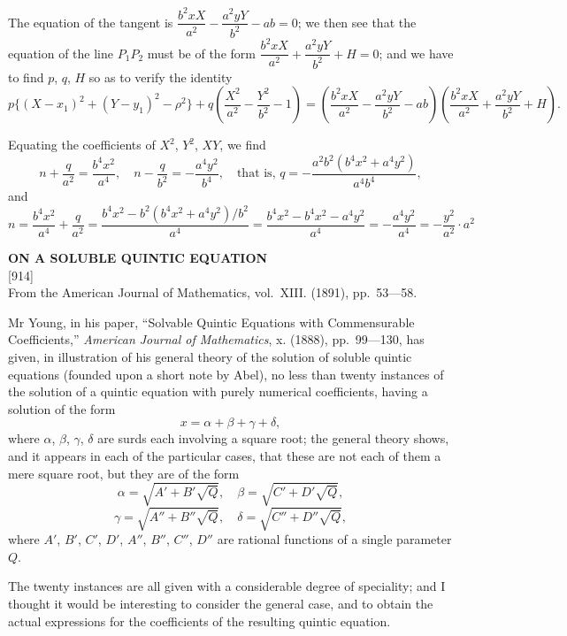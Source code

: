 \documentclass[11pt,a4paper]{article}
\newcommand{\paper}[4]{%
  \newpage
  \begin{center}
    {\large\bfseries #2}\\[0.5em]
    {\small [#1]}\\[0.3em]
    {\small #3}
  \end{center}
  \vspace{0.5em}
}
\begin{document}
The equation of the tangent is $\dfrac{b^2xX}{a^2} - \dfrac{a^2yY}{b^2} - ab = 0$; we then see that the equation of the line $P_1P_2$ must be of the form $\dfrac{b^2xX}{a^2} + \dfrac{a^2yY}{b^2} + H = 0$; and we have to find $p$, $q$, $H$ so as to verify the identity
\[
p\{(X - x_1)^2 + (Y - y_1)^2 - \rho^2\} + q\left(\frac{X^2}{a^2} - \frac{Y^2}{b^2} - 1\right) = \left(\frac{b^2xX}{a^2} - \frac{a^2yY}{b^2} - ab\right)\left(\frac{b^2xX}{a^2} + \frac{a^2yY}{b^2} + H\right).
\]

Equating the coefficients of $X^2$, $Y^2$, $XY$, we find
\[
n + \frac{q}{a^2} = \frac{b^4x^2}{a^4}, \quad n - \frac{q}{b^2} = -\frac{a^4y^2}{b^4}, \quad \text{that is, } q = -\frac{a^2b^2(b^4x^2 + a^4y^2)}{a^4b^4},
\]
and
\[
n = \frac{b^4x^2}{a^4} + \frac{q}{a^2} = \frac{b^4x^2 - b^2(b^4x^2 + a^4y^2)/b^2}{a^4} = \frac{b^4x^2 - b^4x^2 - a^4y^2}{a^4} = -\frac{a^4y^2}{a^4} = -\frac{y^2}{a^2} \cdot a^2
\]
\vspace{-2em}
\begin{flushright}
\end{flushright}

\newpage
\paper{914}{ON A SOLUBLE QUINTIC EQUATION}{From the American Journal of Mathematics, vol.~XIII. (1891), pp.~53---58.}{}

Mr Young, in his paper, ``Solvable Quintic Equations with Commensurable Coefficients,'' \textit{American Journal of Mathematics}, x. (1888), pp.~99---130, has given, in illustration of his general theory of the solution of soluble quintic equations (founded upon a short note by Abel), no less than twenty instances of the solution of a quintic equation with purely numerical coefficients, having a solution of the form
\[
x = \alpha + \beta + \gamma + \delta,
\]
where $\alpha$, $\beta$, $\gamma$, $\delta$ are surds each involving a square root; the general theory shows, and it appears in each of the particular cases, that these are not each of them a mere square root, but they are of the form
\[
\alpha = \sqrt{A' + B'\sqrt{Q}}, \quad \beta = \sqrt{C' + D'\sqrt{Q}},
\]
\[
\gamma = \sqrt{A'' + B''\sqrt{Q}}, \quad \delta = \sqrt{C'' + D''\sqrt{Q}},
\]
where $A'$, $B'$, $C'$, $D'$, $A''$, $B''$, $C''$, $D''$ are rational functions of a single parameter $Q$.

The twenty instances are all given with a considerable degree of speciality; and I thought it would be interesting to consider the general case, and to obtain the actual expressions for the coefficients of the resulting quintic equation.
\end{document}
